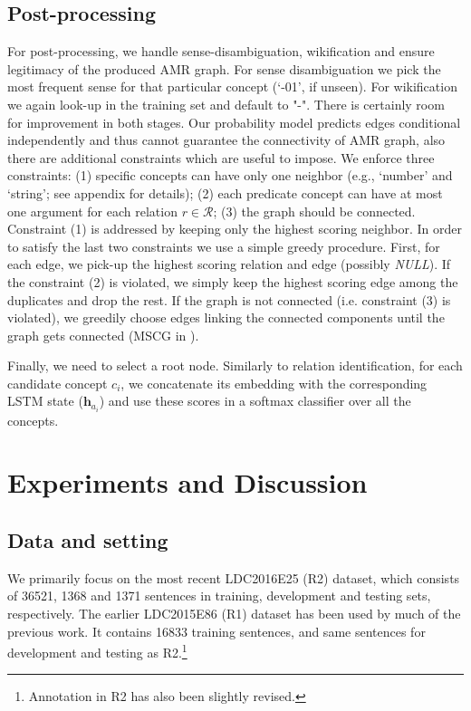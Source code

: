\documentclass[11pt,a4paper]{article}
\begin{document}
\subsection{Post-processing}\label{sec:post}
For post-processing, we handle sense-disambiguation, wikification and ensure legitimacy of the produced AMR graph.
For sense disambiguation we pick the most frequent sense for that particular concept (`-01', if unseen). For wikification we again look-up in the training set and default to "-". There is certainly room for improvement in both stages.
Our probability model predicts edges conditional independently and thus cannot guarantee the connectivity of AMR graph, also there are additional constraints which are useful to impose.
We enforce three constraints: (1) specific concepts can have only one neighbor (e.g., `number' and `string'; see appendix for details); (2) each predicate concept can have at most one argument for each relation $r \in  \mathcal{R}$; (3) the graph should be connected.
Constraint (1) is addressed by keeping only the highest scoring neighbor. In order to satisfy the last two constraints we use a simple greedy procedure. First, for each edge, we pick-up the highest scoring relation and edge (possibly {\it NULL}).  If the constraint (2) is violated, we simply keep the highest scoring edge among the duplicates and drop the rest. If the graph is not connected (i.e. constraint (3) is violated), we greedily choose edges linking the connected components until the graph gets connected (MSCG in ).


Finally, we need to select a root node. Similarly to relation identification,  for each candidate concept $c_i$, we  concatenate its embedding with the corresponding LSTM state ($\mathbf{h}_{a_i}$) and use these scores in a softmax classifier over all the concepts.

\section{Experiments and Discussion}

\subsection{Data and setting}
\label{sect:setting}
We  primarily focus on the most recent LDC2016E25 (R2) dataset, which consists of 36521, 1368 and 1371 sentences in training, development and testing sets, respectively. The earlier LDC2015E86 (R1) dataset has been used by much of the previous work. It contains 16833 training sentences, and same sentences for development and testing as R2.\footnote{Annotation in R2 has also been slightly revised.} 
\end{document}
